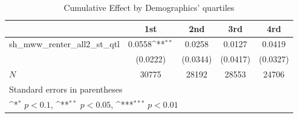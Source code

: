 \begin{table}[htbp]\centering
\def\sym#1{\ifmmode^{#1}\else\(^{#1}\)\fi}
\caption{Cumulative Effect by Demographics' quartiles}
\begin{tabular}{l*{4}{c}}
\hline\hline
            &\multicolumn{1}{c}{1st}&\multicolumn{1}{c}{2nd}&\multicolumn{1}{c}{3rd}&\multicolumn{1}{c}{4rd}\\
\hline
sh\_mww\_renter\_all2\_st\_qtl&      0.0558\sym{**} &      0.0258         &      0.0127         &      0.0419         \\
            &    (0.0222)         &    (0.0344)         &    (0.0417)         &    (0.0327)         \\
\hline
\(N\)       &       30775         &       28192         &       28553         &       24706         \\
\hline\hline
\multicolumn{5}{l}{\footnotesize Standard errors in parentheses}\\
\multicolumn{5}{l}{\footnotesize \sym{*} \(p<0.1\), \sym{**} \(p<0.05\), \sym{***} \(p<0.01\)}\\
\end{tabular}
\end{table}
